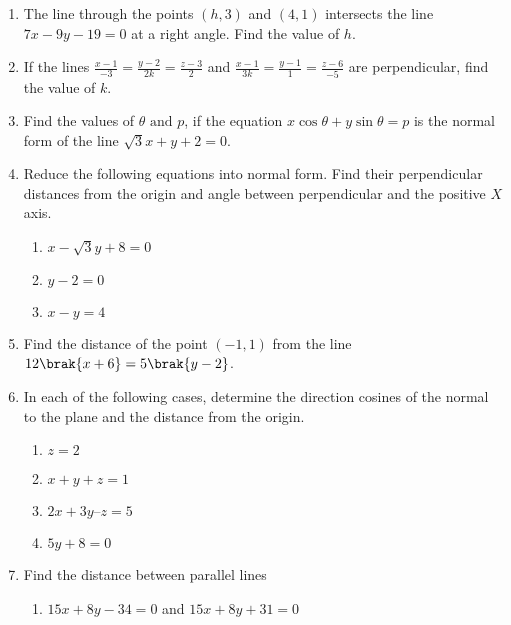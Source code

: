 \begin{enumerate}[label=\thesubsection.\arabic*, ref=\thesubsection.\theenumi]
\item The line through the points $(h,   3)$ and $(4,   1)$ intersects the line $7x- 9y- 19= 0$ at a right angle. Find the value of $h$.
\label{chapters/11/10/3/10}
\\
\solution

	\item If the lines $\frac{x-1}{-3} = \frac{y-2}{2k} = \frac{z-3}{2}$ and  $\frac{x-1}{3k} = \frac{y-1}{1} = \frac{z-6}{-5}$ are perpendicular,   find the value of $k$.\\
    \solution
		
	\item Find the values of $\theta \text{ and } p$,  if the equation $x\cos\theta+y\sin\theta=p$ is the normal form
of the line $\sqrt{3}x+y+2=0$.
\\
\solution
		
\item  Reduce the following equations into normal form. Find their perpendicular distances from the origin and angle between perpendicular and the positive $X$ axis.
\label{chapters/11/10/3/3}
\begin{enumerate}
	\item $x-\sqrt{3}y+8=0$ 
	\item $y-2=0$
	\item $x-y=4$
\end{enumerate}
\solution

\item Find the distance of the point $(-1, 1)$ from the line $12\brak{x+6} = 5\brak{y-2}$. 
\label{chapters/11/10/3/4}
	\\
\solution 

 \item  In each of the following cases,  determine the direction cosines of the normal to
the plane and the distance from the origin.
\begin{enumerate}
	\item $z=2$ 
	\item $x + y + z = 1$
	\item $2x + 3y – z = 5$
	\item $5y + 8 = 0$
\end{enumerate}
    \solution
		
\item Find the distance between parallel lines
\label{chapters/11/10/3/6}
\begin{enumerate}
	\item $15x+8y-34=0$ and  $15x+8y+31=0$ \\

\end{enumerate}
\end{enumerate}
